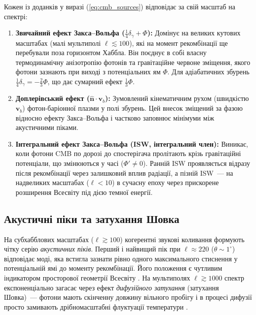 \documentclass[12pt, a4paper]{article}
\begin{document}
Кожен із доданків у виразі (\ref{eq:cmb_sources}) відповідає за свій масштаб на спектрі:
\begin{enumerate}
  \item \textbf{Звичайний ефект Закса--Вольфа ($\frac{1}{4}\delta_\gamma + \Phi$):} Домінує на великих кутових масштабах (малі мультиполі $\ell \lesssim 100$), які на момент рекомбінації ще перебували поза горизонтом Хаббла. Він поєднує в собі власну термодинамічну анізотропію фотонів та гравітаційне червоне зміщення, якого фотони зазнають при виході з потенціальних ям $\Phi$. Для адіабатичних збурень $\frac{1}{4}\delta_\gamma = -\frac{2}{3}\Phi$, що дає сумарний ефект $\frac{1}{3}\Phi$.
  \item \textbf{Доплерівський ефект ($\hat{\mathbf{n}} \cdot \mathbf{v}_b$):} Зумовлений кінематичним рухом (швидкістю $\mathbf{v}_b$) фотон-баріонної плазми у полі збурень. Цей внесок зміщений за фазою відносно ефекту Закса--Вольфа і частково заповнює мінімуми між акустичними піками.
  \item \textbf{Інтегральний ефект Закса--Вольфа (ISW, інтегральний член):} Виникає, коли фотони CMB по дорозі до спостерігача пролітають крізь гравітаційні потенціали, що змінюються у часі ($\Phi' \neq 0$). Ранній ISW проявляється відразу після рекомбінації через залишковий вплив радіації, а пізній ISW~--- на надвеликих масштабах ($\ell < 10$) в сучасну епоху через прискорене розширення Всесвіту під дією темної енергії.
\end{enumerate}

\subsection{Акустичні піки та затухання Шовка}

На субхабблових масштабах ($\ell \gtrsim 100$) когерентні звукові коливання формують чітку серію \emph{акустичних піків}. Перший і найвищий пік при $\ell \approx 220$ ($\theta \sim 1^\circ$) відповідає моді, яка встигла зазнати рівно одного максимального стиснення у потенціальній ямі до моменту рекомбінації. Його положення є чутливим індикатором просторової геометрії Всесвіту \cite{planck_2018}. На мультиполях $\ell \gtrsim 1000$ спектр експоненціально загасає через ефект \emph{дифузійного затухання} (затухання Шовка)~--- фотони мають скінченну довжину вільного пробігу і в процесі дифузії просто замивають дрібномасштабні флуктуації температури \cite{silk_1968}.
\end{document}
